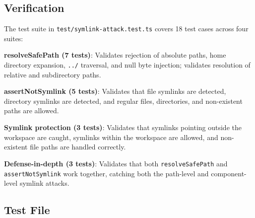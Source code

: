 \subsection*{Verification}
The test suite in \texttt{test/symlink-attack.test.ts} covers 18 test cases across four suites:

\textbf{resolveSafePath (7 tests)}: Validates rejection of absolute paths, home directory expansion, \texttt{../} traversal, and null byte injection; validates resolution of relative and subdirectory paths.

\textbf{assertNotSymlink (5 tests)}: Validates that file symlinks are detected, directory symlinks are detected, and regular files, directories, and non-existent paths are allowed.

\textbf{Symlink protection (3 tests)}: Validates that symlinks pointing outside the workspace are caught, symlinks within the workspace are allowed, and non-existent file paths are handled correctly.

\textbf{Defense-in-depth (3 tests)}: Validates that both \texttt{resolveSafePath} and \texttt{assertNotSymlink} work together, catching both the path-level and component-level symlink attacks.

\subsection*{Test File}
